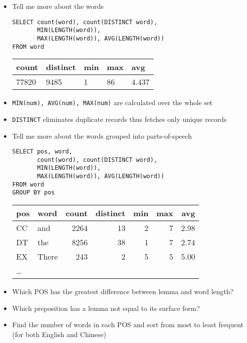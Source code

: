 \documentclass[a4paper,landscape,headrule,footrule,xetex]{foils}
\begin{document}
\begin{itemize}
\item Tell me more about the words
\begin{verbatim}
SELECT count(word), count(DISTINCT word),
       MIN(LENGTH(word)), 
       MAX(LENGTH(word)), AVG(LENGTH(word))
FROM word
\end{verbatim}
  \begin{tabular}{lllll}
    \textbf{count}  & \textbf{distinct} &\textbf{min}  &  \textbf{max} & \textbf{avg} \\ \hline
    77820 & 9485 & 1 & 86 & 4.437
  \end{tabular}
\item  \texttt{MIN(num), AVG(num), MAX(num)} are calculated over the whole set
\item \texttt{DISTINCT} eliminates duplicate records thus fetches only unique records
\end{itemize}

\begin{itemize}
\item Tell me more about the words grouped into parts-of-speech
\begin{verbatim}
SELECT pos, word,
       count(word), count(DISTINCT word),
       MIN(LENGTH(word)), 
       MAX(LENGTH(word)), AVG(LENGTH(word))
FROM word
GROUP BY pos
\end{verbatim}
  \begin{tabular}{llrrrrr}
    \textbf{pos} & \textbf{word} & \textbf{count} & \textbf{distinct}  
  & \textbf{min}  &  \textbf{max} & \textbf{avg} \\ \hline
  CC & and  & 2264 & 13 & 2 & 7 & 2.98 \\
  DT & the  & 8256 & 38 & 1 & 7 & 2.74 \\
  EX & There&  243 &  2 & 5 & 5 & 5.00  \\
\ldots
  \end{tabular}
\end{itemize}



\begin{itemize}
\item Which POS has the greatest difference between lemma and word length?
\item Which preposition has a lemma not equal to its surface form?
\item Find the number of words in each POS and sort from most to least
  frequent (for both English and Chinese)
\end{itemize}
\end{document}
